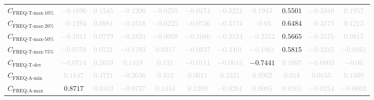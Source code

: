 \documentclass{standalone}
\newcommand{\freqmaxtenname}{\text{FREQ-T-max-10\%}}
\newcommand{\freqmaxten}{C_{\freqmaxtenname}}
\newcommand{\freqmaxtwentyname}{\text{FREQ-T-max-20\%}}
\newcommand{\freqmaxtwenty}{C_{\freqmaxtwentyname}}
\newcommand{\freqmaxfiftyname}{\text{FREQ-T-max-50\%}}
\newcommand{\freqmaxfifty}{C_{\freqmaxfiftyname}}
\newcommand{\freqmaxseventyfivename}{\text{FREQ-T-max-75\%}}
\newcommand{\freqmaxseventyfive}{C_{\freqmaxseventyfivename}}
\newcommand{\freqdevname}{\text{FREQ-T-dev}}
\newcommand{\freqdev}{C_{\freqdevname}}
\newcommand{\actfreqminname}{\text{FREQ-A-min}}
\newcommand{\actfreqmin}{C_{\actfreqminname}}
\newcommand{\actfreqmaxname}{\text{FREQ-A-max}}
\newcommand{\actfreqmax}{C_{\actfreqmaxname}}
\begin{document}
\begin{tabular}{lcccccccccc}
$\freqmaxten$ & \textcolor{lightgray}{$-0.1696$} & \textcolor{lightgray}{$0.1545$} & \textcolor{lightgray}{$-0.1206$} & \textcolor{lightgray}{$-0.0255$} & \textcolor{lightgray}{$-0.0174$} & \textcolor{lightgray}{$-0.3221$} & \textcolor{lightgray}{$0.1943$} & $0.5501$ & \textcolor{lightgray}{$-0.3349$} & \textcolor{lightgray}{$0.1957$} \\ 
$\freqmaxtwenty$ & \textcolor{lightgray}{$-0.1294$} & \textcolor{lightgray}{$0.0981$} & \textcolor{lightgray}{$-0.1518$} & \textcolor{lightgray}{$-0.0225$} & \textcolor{lightgray}{$-0.0756$} & \textcolor{lightgray}{$-0.3174$} & \textcolor{lightgray}{$-0.01$} & $0.6484$ & \textcolor{lightgray}{$-0.3175$} & \textcolor{lightgray}{$0.1213$} \\ 
$\freqmaxfifty$ & \textcolor{lightgray}{$-0.1011$} & \textcolor{lightgray}{$0.0779$} & \textcolor{lightgray}{$-0.1824$} & \textcolor{lightgray}{$-0.0009$} & \textcolor{lightgray}{$-0.1086$} & \textcolor{lightgray}{$-0.3124$} & \textcolor{lightgray}{$-0.2352$} & $0.5665$ & \textcolor{lightgray}{$-0.3575$} & \textcolor{lightgray}{$0.0815$} \\ 
$\freqmaxseventyfive$ & \textcolor{lightgray}{$-0.0759$} & \textcolor{lightgray}{$0.0721$} & \textcolor{lightgray}{$-0.1703$} & \textcolor{lightgray}{$0.0317$} & \textcolor{lightgray}{$-0.0937$} & \textcolor{lightgray}{$-0.3401$} & \textcolor{lightgray}{$-0.1861$} & $0.5815$ & \textcolor{lightgray}{$-0.3245$} & \textcolor{lightgray}{$-0.0161$} \\ 
$\freqdev$ & \textcolor{lightgray}{$-0.0714$} & \textcolor{lightgray}{$0.2659$} & \textcolor{lightgray}{$0.1418$} & \textcolor{lightgray}{$0.131$} & \textcolor{lightgray}{$-0.0111$} & \textcolor{lightgray}{$-0.0615$} & $-0.7441$ & \textcolor{lightgray}{$0.1097$} & \textcolor{lightgray}{$-0.0803$} & \textcolor{lightgray}{$-0.06$} \\ 
$\actfreqmin$ & \textcolor{lightgray}{$0.1847$} & \textcolor{lightgray}{$0.4721$} & \textcolor{lightgray}{$-0.2636$} & \textcolor{lightgray}{$0.312$} & \textcolor{lightgray}{$0.0011$} & \textcolor{lightgray}{$0.2331$} & \textcolor{lightgray}{$0.0902$} & \textcolor{lightgray}{$0.018$} & \textcolor{lightgray}{$0.0155$} & \textcolor{lightgray}{$0.1509$} \\ 
$\actfreqmax$ & $0.8717$ & \textcolor{lightgray}{$0.0343$} & \textcolor{lightgray}{$-0.0737$} & \textcolor{lightgray}{$0.1454$} & \textcolor{lightgray}{$0.1209$} & \textcolor{lightgray}{$-0.0261$} & \textcolor{lightgray}{$0.0085$} & \textcolor{lightgray}{$0.0161$} & \textcolor{lightgray}{$-0.0254$} & \textcolor{lightgray}{$-0.0002$} \\ 

\end{tabular}
\end{document}
